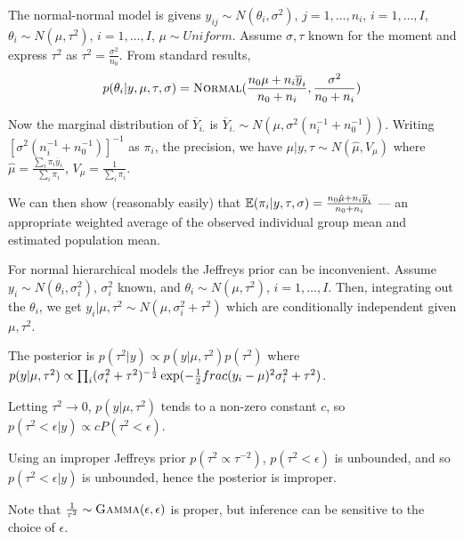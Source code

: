 \begin{defn}
  \label{sec:heirachcial-models-2}
  The normal-normal model is givens $y_{ij} \sim N(\theta_{i},
  \sigma^{2})$, $j = 1, \dots, n_{i}$, $i = 1, \dots, I$, $\theta_{i}
  \sim N(\mu, \tau^{2})$, $i = 1, \dots, I$, $\mu \sim Uniform$.
  Assume $\sigma, \tau$ known for the moment and express $\tau^{2}$
  as $\tau^{2} = \frac{\sigma^{2}}{n_{0}}$.  From standard results,
  \begin{equation}
    \label{eq:21}
    p(\theta_{i} | y, \mu, \tau, \sigma) = \textsc{Normal}(\frac{n_{0} \mu +
      n_{i} \overline y_{i}}{n_{0} + n_{i}}, \frac{\sigma^{2}}{n_{0} +
      n_{i}})
  \end{equation}

  Now the marginal distribution of $\overline Y_{i.}$ is $\overline
  Y_{i.} \sim N(\mu, \sigma^{2}(n_{i}^{-1} + n_{0}^{-1}))$.  Writing
  $[\sigma^{2}(n_{i}^{-1} + n_{0}^{-1})]^{-1}$ as $\pi_{i}$, the
  precision, we have $\mu | y, \tau \sim N(\hat \mu, V_{\mu})$ where
  $\hat \mu = \frac{\sum_{i}^{} \pi_{i} \overline y_{i.}}{\sum_{i}^{}
    \pi_{i}} $, $V_{\mu} = \frac{1}{\sum_{i}^{} \pi_{i}}$.

  We can then show (reasonably easily) that $\E{\pi_{i}| y, \tau,
    \sigma} = \frac{n_{0} \hat \mu + n_{i} \overline y_{i}}{n_{0} +
    n_{i}}$ --- an appropriate weighted average of the observed
  individual group mean and estimated population mean.
\end{defn}

\begin{defn}
  \label{sec:heirachcial-models-3}
  For normal hierarchical models the Jeffreys prior can be
  inconvenient.  Assume $y_{i} \sim N(\theta_{i}, \sigma_{i}^{2})$,
  $\sigma_{i}^{2}$ known, and $\theta_{i} \sim N(\mu, \tau^{2})$, $i =
  1, \dots, I$.  Then, integrating out the $\theta_{i}$, we get $y_{i}
  | \mu, \tau^{2} \sim N(\mu, \sigma_{i}^{2} + \tau^{2})$ which are
  conditionally independent given $\mu, \tau^{2}$.

  The posterior is $p(\tau^{2} | y) \propto p(y | \mu, \tau^{2})
  p(\tau^{2})$ where $p(y | \mu, \tau^{2}) \propto \prod_{i}
  (\sigma_{i}^{2} + \tau^{2})^{-\frac{1}{2}} \exp(-\frac{1}{2}
  \\frac{(y_{i} - \mu)^{2}}{\sigma_{i}^{2} + \tau^{2}})$.

  Letting $\tau^{2} \rightarrow 0$, $p(y | \mu, \tau^{2})$ tends to a
  non-zero constant $c$, so $p(\tau^{2} < \epsilon | y) \propto
  cP(\tau^{2} < \epsilon)$.

  Using an improper Jeffreys prior $p(\tau^{2} \propto \tau^{-2})$,
  $p(\tau^{2} < \epsilon)$ is unbounded, and so $p(\tau^{2} < \epsilon
  | y)$ is unbounded, hence the posterior is improper.

  Note that $\frac{1}{\tau^{2}} \sim \textsc{Gamma}(\epsilon, \epsilon)$ is
  proper, but inference can be sensitive to the choice of $\epsilon$.
\end{defn}

